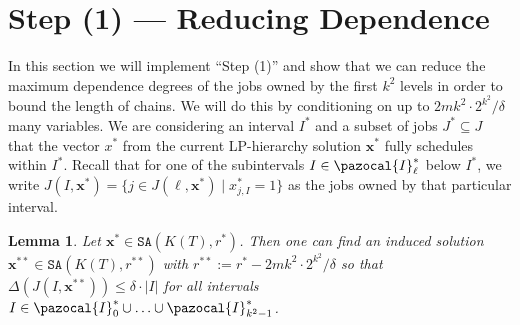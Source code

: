 \documentclass[11pt,letterpaper,oneside,english]{article}
\theoremstyle{theorem}
\newtheorem{lemma}[theorem]{Lemma}
\begin{document}
\section{Step (1) --- Reducing Dependence} \label{sec:ReducingDependence}


In this section we will implement ``Step (1)'' and show that we can reduce the maximum dependence degrees of 
the jobs owned by the first $k^2$ levels in order to bound the length of chains. 
We will do this by conditioning on up to
$2mk^2 \cdot 2^{k^2} / \delta$ many variables.
We are considering an interval $I^*$ and 
a subset of jobs $J^*  \subseteq J$ that the vector $x^{*}$ from the current LP-hierarchy solution $\bm{x}^*$ fully
schedules within $I^*$. Recall that for one of the subintervals $I \in \pazocal{I}_{\ell}^*$ 
below $I^*$, we write $J(I,\bm{x}^*) = \{ j \in J(\ell,\bm{x}^{*}) \mid x_{j,I}^{*} = 1 \}$
as the jobs owned by that particular interval.
\begin{lemma} \label{lem:BreakingChains}
Let $\bm{x}^* \in \texttt{SA}(K(T),r^*)$.
Then one can find an induced solution $\bm{x}^{**} \in \texttt{SA}(K(T),r^{**})$
with $r^{**} := r^* -2mk^2 \cdot 2^{k^2} / \delta$
so that $\Delta(J(I,\bm{x}^{**})) \leq \delta \cdot |I|$ for all
intervals $I \in \pazocal{I}_0^* \cup \ldots \cup \pazocal{I}_{k^2-1}^*$.
\end{lemma}
\end{document}
